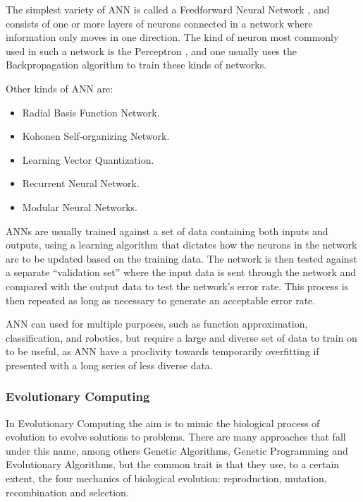 The simplest variety of ANN is called a Feedforward Neural Network
\citep{wikipediafeedforward}, and consists of one or more layers of neurons
connected in a network where information only moves in one direction. The kind
of neuron most commonly used in such a network is the Perceptron
\citep{minsky1969perceptrons}, and one usually uses the Backpropagation
\citep{wikipediabackpropagation} algorithm to train these kinds of networks.

Other kinds of ANN are:
\begin{itemize}
\item Radial Basis Function Network.
\item Kohonen Self-organizing Network.
\item Learning Vector Quantization.
\item Recurrent Neural Network.
\item Modular Neural Networks.
\end{itemize}

ANNs are usually trained against a set of data containing both inputs and
outputs, using a learning algorithm that dictates how the neurons in the network
are to be updated based on the training data. The network is then tested against
a separate ``validation set'' where the input data is sent through the network
and compared with the output data to test the network's error rate. This process
is then repeated as long as necessary to generate an acceptable error rate.

ANN can used for multiple purposes, such as function approximation,
classification, and robotics, but require a large and diverse set of data to
train on to be useful, as ANN have a proclivity towards temporarily overfitting
if presented with a long series of less diverse data.

\subsubsection{Evolutionary Computing}
\label{sec:evol-comp}

In Evolutionary Computing the aim is to mimic the biological process of
evolution to evolve solutions to problems. There are many approaches that fall
under this name, among others Genetic Algorithms, Genetic Programming and
Evolutionary Algorithms, but the common trait is that they use, to a certain
extent, the four mechanics of biological evolution: reproduction, mutation,
recombination and selection.

